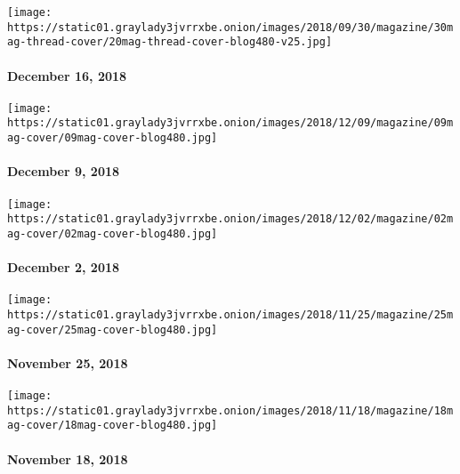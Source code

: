 \texttt{[image: https://static01.graylady3jvrrxbe.onion/images/2018/09/30/magazine/30mag-thread-cover/20mag-thread-cover-blog480-v25.jpg]}

\hypertarget{december-16-2018}{%
\paragraph{December 16, 2018}\label{december-16-2018}}

\href{https://www.nytimes3xbfgragh.onion/issue/magazine/2018/12/07/the-12918-issue}{}

\texttt{[image: https://static01.graylady3jvrrxbe.onion/images/2018/12/09/magazine/09mag-cover/09mag-cover-blog480.jpg]}

\hypertarget{december-9-2018}{%
\paragraph{December 9, 2018}\label{december-9-2018}}

\href{https://www.nytimes3xbfgragh.onion/issue/magazine/2018/12/07/the-12218-issue}{}

\texttt{[image: https://static01.graylady3jvrrxbe.onion/images/2018/12/02/magazine/02mag-cover/02mag-cover-blog480.jpg]}

\hypertarget{december-2-2018}{%
\paragraph{December 2, 2018}\label{december-2-2018}}

\href{https://www.nytimes3xbfgragh.onion/issue/magazine/2018/11/21/the-112518-issue}{}

\texttt{[image: https://static01.graylady3jvrrxbe.onion/images/2018/11/25/magazine/25mag-cover/25mag-cover-blog480.jpg]}

\hypertarget{november-25-2018}{%
\paragraph{November 25, 2018}\label{november-25-2018}}

\href{https://www.nytimes3xbfgragh.onion/issue/magazine/2018/11/16/the-111818-issue}{}

\texttt{[image: https://static01.graylady3jvrrxbe.onion/images/2018/11/18/magazine/18mag-cover/18mag-cover-blog480.jpg]}

\hypertarget{november-18-2018}{%
\paragraph{November 18, 2018}\label{november-18-2018}}

